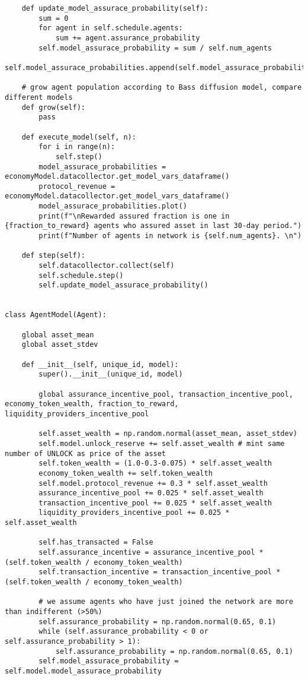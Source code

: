 \documentclass{article}
\begin{document}
\begin{lstlisting}
    def update_model_assurace_probability(self):
        sum = 0
        for agent in self.schedule.agents:
            sum += agent.assurance_probability
        self.model_assurace_probability = sum / self.num_agents
        self.model_assurace_probabilities.append(self.model_assurace_probability)

    # grow agent population according to Bass diffusion model, compare different models
    def grow(self):
        pass

    def execute_model(self, n):
        for i in range(n):
            self.step()
        model_assurace_probabilities = economyModel.datacollector.get_model_vars_dataframe()
        protocol_revenue = economyModel.datacollector.get_model_vars_dataframe()
        model_assurace_probabilities.plot()
        print(f"\nRewarded assured fraction is one in {fraction_to_reward} agents who assured asset in last 30-day period.")
        print(f"Number of agents in network is {self.num_agents}. \n")

    def step(self):
        self.datacollector.collect(self)
        self.schedule.step()
        self.update_model_assurace_probability()


class AgentModel(Agent):

    global asset_mean
    global asset_stdev

    def __init__(self, unique_id, model):
        super().__init__(unique_id, model)

        global assurance_incentive_pool, transaction_incentive_pool, economy_token_wealth, fraction_to_reward, liquidity_providers_incentive_pool

        self.asset_wealth = np.random.normal(asset_mean, asset_stdev)
        self.model.unlock_reserve += self.asset_wealth # mint same number of UNLOCK as price of the asset
        self.token_wealth = (1.0-0.3-0.075) * self.asset_wealth
        economy_token_wealth += self.token_wealth
        self.model.protocol_revenue += 0.3 * self.asset_wealth
        assurance_incentive_pool += 0.025 * self.asset_wealth
        transaction_incentive_pool += 0.025 * self.asset_wealth
        liquidity_providers_incentive_pool += 0.025 * self.asset_wealth

        self.has_transacted = False
        self.assurance_incentive = assurance_incentive_pool * (self.token_wealth / economy_token_wealth)
        self.transaction_incentive = transaction_incentive_pool * (self.token_wealth / economy_token_wealth)

        # we assume agents who have just joined the network are more than indifferent (>50%)
        self.assurance_probability = np.random.normal(0.65, 0.1)
        while (self.assurance_probability < 0 or self.assurance_probability > 1):
            self.assurance_probability = np.random.normal(0.65, 0.1)
        self.model_assurace_probability = self.model.model_assurace_probability


\end{lstlisting}
\end{document}
